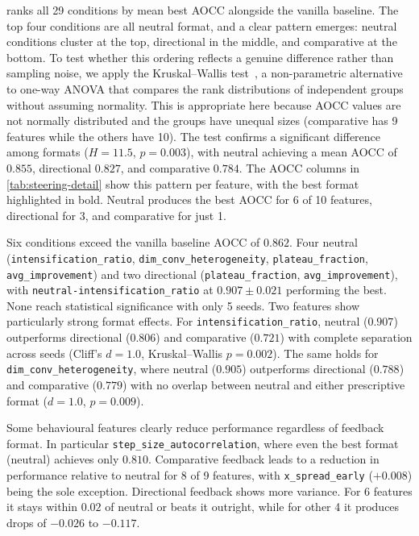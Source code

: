  ranks all 29 conditions by mean best AOCC alongside the vanilla baseline. The top four conditions are all neutral format, and a clear pattern emerges: neutral conditions cluster at the top, directional in the middle, and comparative at the bottom. To test whether this ordering reflects a genuine difference rather than sampling noise, we apply the Kruskal--Wallis test~\cite{kruskal1952ranks}, a non-parametric alternative to one-way ANOVA that compares the rank distributions of independent groups without assuming normality. This is appropriate here because AOCC values are not normally distributed and the groups have unequal sizes (comparative has 9 features while the others have 10). The test confirms a significant difference among formats ($H = 11.5$, $p = 0.003$), with neutral achieving a mean AOCC of $0.855$, directional $0.827$, and comparative $0.784$. The AOCC columns in \cref{tab:steering-detail} show this pattern per feature, with the best format highlighted in bold. Neutral produces the best AOCC for 6 of 10 features, directional for 3, and comparative for just 1.

Six conditions exceed the vanilla baseline AOCC of $0.862$. Four neutral (\texttt{intensification\_ratio}, \texttt{dim\_conv\_heterogeneity}, \texttt{plateau\_fraction}, \texttt{avg\_improvement}) and two directional (\texttt{plateau\_fraction}, \texttt{avg\_improvement}), with \texttt{neutral-intensification\_ratio} at $0.907 \pm 0.021$ performing the best. None reach statistical significance with only 5 seeds. Two features show particularly strong format effects. For \texttt{intensification\_ratio}, neutral ($0.907$) outperforms directional ($0.806$) and comparative ($0.721$) with complete separation across seeds (Cliff's $d = 1.0$, Kruskal--Wallis $p = 0.002$). The same holds for \texttt{dim\_conv\_heterogeneity}, where neutral ($0.905$) outperforms directional ($0.788$) and comparative ($0.779$) with no overlap between neutral and either prescriptive format ($d = 1.0$, $p = 0.009$).

Some behavioural features clearly reduce performance regardless of feedback format. In particular \texttt{step\_size\_autocorrelation}, where even the best format (neutral) achieves only $0.810$. Comparative feedback leads to a reduction in performance relative to neutral for 8 of 9 features, with \texttt{x\_spread\_early} ($+0.008$) being the sole exception. Directional feedback shows more variance. For 6 features it stays within $0.02$ of neutral or beats it outright, while for other 4 it produces drops of $-0.026$ to $-0.117$.

